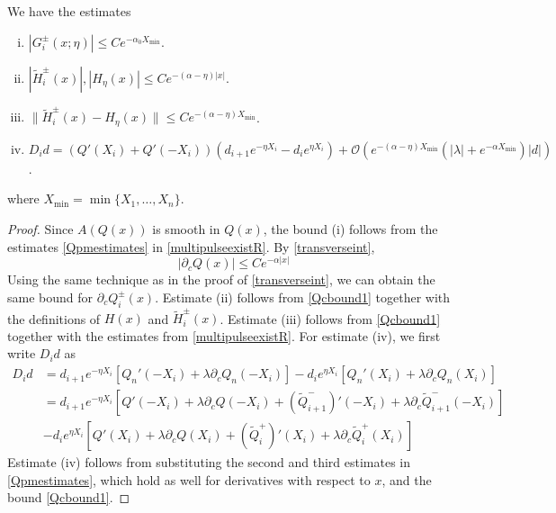 \documentclass[thesis.tex]{subfiles}
\begin{document}
\begin{lemma}\label{lemma:weightedest}
We have the estimates
\begin{enumerate}[(i)]
	\item $|G_i^\pm(x; \eta)| \leq C e^{-\alpha_0 X_{\min}}$.
	\item $|\tilde{H}_i^\pm(x)|, |H_\eta(x)| \leq C e^{-(\alpha - \eta)|x|}$.
	\item $\|\tilde{H}_i^\pm(x) - H_\eta(x) \|  \leq C e^{-(\alpha - \eta) X_{\min}} $.
	\item $D_i d = ( Q'(X_i) + Q'(-X_i) )(d_{i+1} e^{-\eta X_i} - d_i e^{\eta X_i}) + \mathcal{O} \left( e^{-(\alpha - \eta) X_{\min}}\left( |\lambda| +  e^{-\alpha X_{\min}} \right) |d| \right)$.
\end{enumerate}
where $X_{\min} = \min\{X_1, \dots, X_n\}$.
\begin{proof}
Since $A(Q(x))$ is smooth in $Q(x)$, the bound (i) follows from the estimates \cref{Qpmestimates} in \cref{multipulseexistR}. By \cref{transverseint},
\begin{equation}\label{Qcbound1}
|\partial_c Q(x)| \leq C e^{-\alpha|x|}
\end{equation}
Using the same technique as in the proof of \ref{transverseint}, we can obtain the same bound for $\partial_c Q_i^\pm(x)$. Estimate (ii) follows from \cref{Qcbound1} together with the definitions of $H(x)$ and $\tilde{H}_i^\pm(x)$. Estimate (iii) follows from \cref{Qcbound1} together with the estimates from \cref{multipulseexistR}. For estimate (iv), we first write $D_i d$ as
\begin{align*}
D_i d &= d_{i+1} e^{-\eta X_i}[ Q_n'(-X_i) + \lambda \partial_c Q_n(-X_i)] 
- d_i e^{\eta X_i}[ Q_n'(X_i) + \lambda \partial_c Q_n(X_i)]  \\
&= d_{i+1} e^{-\eta X_i} [ Q'(-X_i) + \lambda \partial_c Q(-X_i) + (\tilde{Q}_{i+1}^-)'(-X_i) + \lambda  \partial_c \tilde{Q}_{i+1}^-(-X_i)] \\
&- d_i e^{\eta X_i} [ Q'(X_i) + \lambda \partial_c Q(X_i) + (\tilde{Q}_i^+)'(X_i) + \lambda \partial_c \tilde{Q}_i^+(X_i)] 
\end{align*}
Estimate (iv) follows from substituting the second and third estimates in \cref{Qpmestimates}, which hold as well for derivatives with respect to $x$, and the bound \cref{Qcbound1}.	
\end{proof}
\end{lemma}
\end{document}
